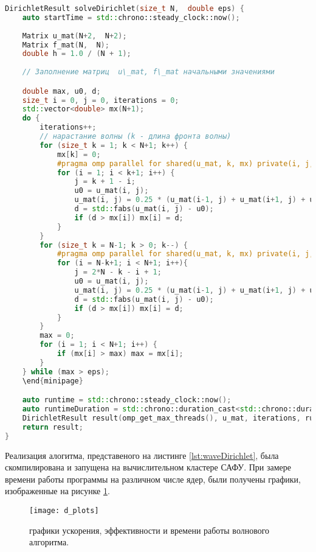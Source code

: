 \documentclass[13pt]{article}
\begin{document}
	\noindent\begin{minipage}{\textwidth}
	\begin{lstlisting}[language=C++, caption={solveDirichlet(size\_t N, double eps)}, label={lst:waveDirichlet}, texcl=true]
DirichletResult solveDirichlet(size_t N,  double eps) {
	auto startTime = std::chrono::steady_clock::now();
	
	Matrix u_mat(N+2,  N+2);
	Matrix f_mat(N,  N);
	double h = 1.0 / (N + 1);
	
	// Заполнение матриц  u\_mat, f\_mat начальными значениями 

	double max, u0, d;
	size_t i = 0, j = 0, iterations = 0;
	std::vector<double> mx(N+1);
	do {
		iterations++;
		// нарастание волны (k - длина фронта волны)
		for (size_t k = 1; k < N+1; k++) {
			mx[k] = 0;
			#pragma omp parallel for shared(u_mat, k, mx) private(i, j, u0, d) schedule(static, 1)
			for (i = 1; i < k+1; i++) {
				j = k + 1 - i;
				u0 = u_mat(i, j);
				u_mat(i, j) = 0.25 * (u_mat(i-1, j) + u_mat(i+1, j) + u_mat(i, j-1) + u_mat(i, j+1) - h*h*f_mat(i-1, j-1));
				d = std::fabs(u_mat(i, j) - u0);
				if (d > mx[i]) mx[i] = d;
			}
		}
		for (size_t k = N-1; k > 0; k--) {
			#pragma omp parallel for shared(u_mat, k, mx) private(i, j, u0, d) schedule(static, 1)
			for (i = N-k+1; i < N+1; i++){
				j = 2*N - k - i + 1;
				u0 = u_mat(i, j);
				u_mat(i, j) = 0.25 * (u_mat(i-1, j) + u_mat(i+1, j) + u_mat(i, j-1) + u_mat(i, j+1) - h*h*f_mat(i-1, j-1));
				d = std::fabs(u_mat(i, j) - u0);
				if (d > mx[i]) mx[i] = d;				
			}
		}
		max = 0;
		for (i = 1; i < N+1; i++) {
			if (mx[i] > max) max = mx[i];
		}
	} while (max > eps);
	\end{minipage}

	auto runtime = std::chrono::steady_clock::now();
	auto runtimeDuration = std::chrono::duration_cast<std::chrono::duration<double>>(runtime - startTime);
	DirichletResult result(omp_get_max_threads(), u_mat, iterations, runtimeDuration.count(), eps);
	return result;
}
	\end{lstlisting}
	\end{minipage}

	Реализация алогитма, представеного на листинге \ref{lst:waveDirichlet}, была скомпилирована и запущена на вычислительном кластере САФУ. При замере времени работы программы на различном числе ядер, были получены графики, изображенные на рисунке \ref{fig:dplots}.
	
	\begin{figure}[h]
		\centering		\texttt{[image: d\_plots]}
		\caption{графики ускорения, эффективности и времени работы волнового алгоритма.}
		\label{fig:dplots} 
	\end{figure}
	
\end{document}

